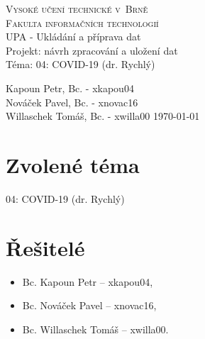 \documentclass[11pt,a4paper,titlepage]{article}
\begin{document}
\begin{titlepage}
\begin{center}
    {\LARGE\textsc{Vysoké učení technické v~Brně}}\\
    \smallskip
    {\Large\textsc{Fakulta informačních technologií}}\\
    \bigskip
    \Large{UPA - Ukládání a příprava dat}\\
    \smallskip
    \LARGE{Projekt: návrh zpracování a uložení dat}\\
    \smallskip
    \Huge{Téma: 04: COVID-19 (dr. Rychlý)}\\
\end{center}
    {\Large Kapoun Petr, Bc. - xkapou04}\smallskip\\
    {\Large Nováček Pavel, Bc. - xnovac16}\smallskip\\
    {\Large Willaschek Tomáš, Bc. - xwilla00 \hfill \today }
\end{titlepage}

\tableofcontents
\newpage

\section{Zvolené téma}
04: COVID-19 (dr. Rychlý)
\section{Řešitelé}
\begin{itemize}
    \setlength\itemsep{0.3em}
    \item Bc. Kapoun Petr -- xkapou04,
    \item Bc. Nováček Pavel -- xnovac16,
    \item Bc. Willaschek Tomáš -- xwilla00.
\end{itemize}
\end{document}
